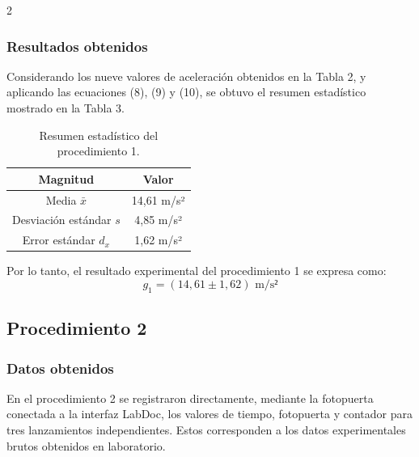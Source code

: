 \documentclass[11pt,letterpaper]{article}
\begin{document}
\begin{multicols}{2}
\vspace*{0pt}

\subsubsection{Resultados obtenidos}

Considerando los nueve valores de aceleración obtenidos en la Tabla 2, y aplicando las ecuaciones (8), (9) y (10), se obtuvo el resumen estadístico mostrado en la Tabla 3.

\begin{table}[H]
\centering
\small
\begin{tabular}{cc}
\toprule
Magnitud & Valor \\
\midrule
Media $\bar{x}$ & 14,61 m/s² \\
Desviación estándar $s$ & 4,85 m/s² \\
Error estándar $d_x$ & 1,62 m/s² \\
\bottomrule
\end{tabular}
\caption{Resumen estadístico del procedimiento 1.}
\end{table}

Por lo tanto, el resultado experimental del procedimiento 1 se expresa como:
\begin{equation}
g_1 = (14,61 \pm 1,62) \text{ m/s²}
\end{equation}

\subsection{Procedimiento 2}

\subsubsection{Datos obtenidos}

En el procedimiento 2 se registraron directamente, mediante la fotopuerta conectada a la interfaz LabDoc, los valores de tiempo, fotopuerta y contador para tres lanzamientos independientes. Estos corresponden a los datos experimentales brutos obtenidos en laboratorio.


\end{multicols}
\end{document}
